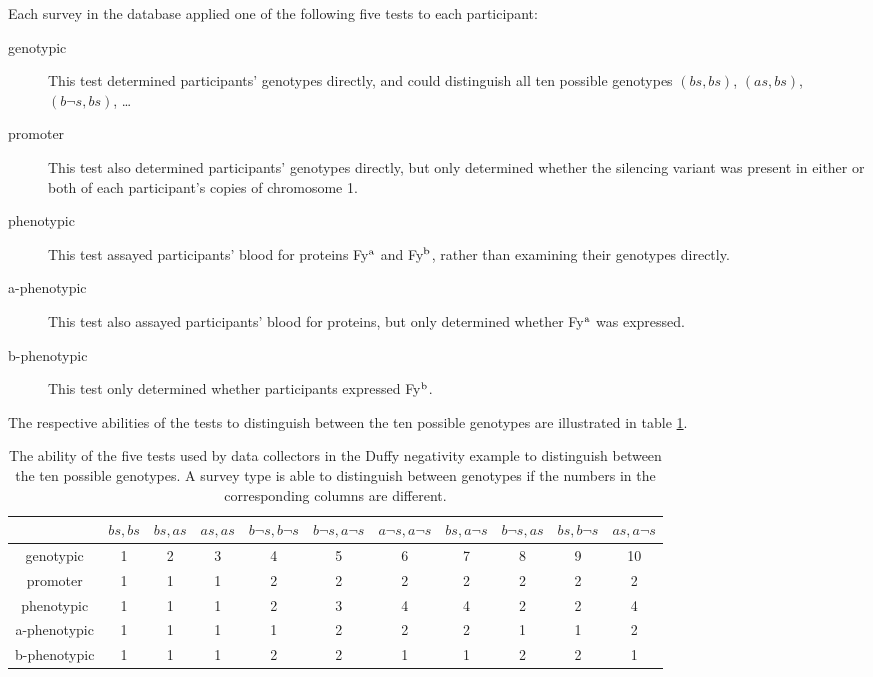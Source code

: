 \documentclass[article]{jss}
\begin{document}
Each survey in the database applied one of the following five tests to each participant:
\begin{description}
    \item[genotypic] This test determined participants' genotypes directly, and
could distinguish all ten possible genotypes $(bs,bs)$, $(as,bs)$, $(b\neg s,bs)$, \ldots
    \item[promoter] This test also determined participants' genotypes directly, but only determined whether the silencing variant was present in either or both of each participant's copies of chromosome 1.
    \item[phenotypic] This test assayed participants' blood for proteins Fy$^\textup{a}$ and Fy$^\textup{b}$, rather than examining their genotypes directly.
    \item[a-phenotypic] This test also assayed participants' blood for proteins, but only determined whether Fy$^\textup{a}$ was expressed.
    \item[b-phenotypic] This test only determined whether participants expressed Fy$^\textup{b}$.
\end{description}
The respective abilities of the tests to distinguish between the ten possible genotypes are illustrated in table \ref{tab:surveys}.

\begin{table}
    \centering
    \begin{small}
        \begin{tabular}{ccccccccccc}
            &$bs,bs$&$bs,as$&$as,as$&$b\neg s,b\neg s$&$b\neg s,a\neg s$&$a\neg s,a\neg s$&$bs,a\neg s$&$b\neg s,as$&$bs,b\neg s$&$as,a\neg s$\\
            \hline\hline
            genotypic&1&2&3&4&5&6&7&8&9&10\\
            promoter&1&1&1&2&2&2&2&2&2&2\\
            phenotypic&1&1&1&2&3&4&4&2&2&4\\
            a-phenotypic&1&1&1&1&2&2&2&1&1&2\\
            b-phenotypic&1&1&1&2&2&1&1&2&2&1
            \label{tab:equiv-class}
        \end{tabular}            
    \end{small}
    \caption{The ability of the five tests used by data collectors in the Duffy negativity example to distinguish between the ten possible genotypes. A survey type is able to distinguish between genotypes if the numbers in the corresponding columns are different.}
    \label{tab:surveys}  
\end{table}
\end{document}
